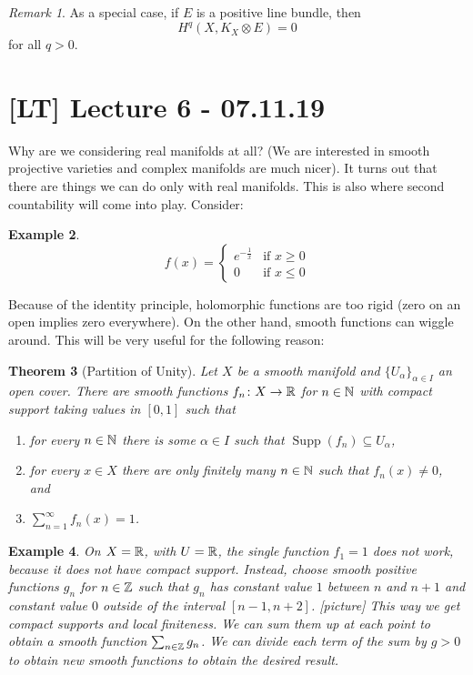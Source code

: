 \documentclass[A4paper, british, reqno]{amsart}
\theoremstyle{darkgreentheorem}
\newtheorem{thm}{Theorem}[section]
\theoremstyle{darkbluedefinition}
\theoremstyle{darkredexample}
\newtheorem{exa}[thm]{Example}
\theoremstyle{remark}
\newtheorem{rem}[thm]{Remark}
\DeclareMathOperator{\Supp}{Supp}
\newcommand{\1}{\mathbbm{1}}
\newcommand{\ot}{\otimes}
\begin{document}
\begin{rem}
    As a special case, if $E$ is a positive line bundle, then
    \[H^{q}(X,K_{X}\ot E)=0\]
    for all $q>0$.
\end{rem}

\section{[LT] Lecture 6 - 07.11.19}

Why are we considering real manifolds at all?
(We are interested in smooth projective varieties and complex manifolds are much nicer).
It turns out that there are things we can do only with real manifolds.
This is also where second countability will come into play.
Consider:

\begin{exa}
    \[ f(x)=\begin{cases} e^{-\frac{1}{x}} &\text{if } x\geqslant 0 \\ 0 &\text{if } x\leqslant 0
    \end{cases} \]
\end{exa}
Because of the identity principle, holomorphic functions are too rigid (zero on an open implies zero everywhere).
On the other hand, smooth functions can wiggle around.
This will be very useful for the following reason:

\begin{thm}[Partition of Unity]
    Let $X$ be a smooth manifold and $\{ U_{\alpha}\}_{\alpha\in I}$ an open cover.
    There are smooth functions $f_{n}\colon X\to \mathbb{R}$ for $n\in \mathbb{N}$ with compact support taking values in $[0,1]$ such that
    \begin{enumerate}[label=\roman*)]
	\item for every $n\in \mathbb{N}$ there is some $\alpha\in I$ such that $\Supp(f_{n})\subseteq U_{\alpha}$,
	\item for every $x\in X$ there are only finitely many $n\in \mathbb{N}$ such that $f_{n}(x)\neq 0$, and
	\item $\sum_{n=1}^{\infty} f_{n}(x)=1$.
    \end{enumerate}
\end{thm}

\begin{exa}
    On $X=\mathbb{R}$, with $U=\mathbb{R}$, the single function $f_{1}=1$ does not work, because it does not have compact support.
    Instead, choose smooth positive functions $g_{n}$ for $n\in \mathbb{Z}$ such that $g_{n}$ has constant value $1$ between $n$ and $n+1$ and constant value $0$ outside of the interval $[n-1,n+2]$.
    [picture]
    This way we get compact supports and local finiteness.
    We can sum them up at each point to obtain a smooth function $\sum_{n\in \mathbb{Z}}g_{n}$.
    We can divide each term of the sum by $g>0$ to obtain new smooth functions to obtain the desired result.
\end{exa}
\end{document}
